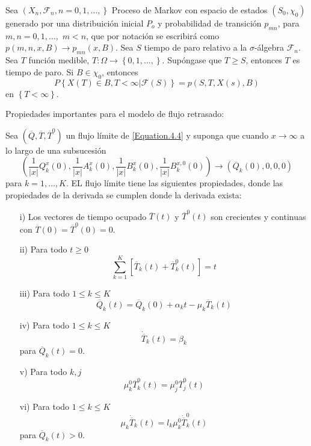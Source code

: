 \begin{Teo}
Sea $\left(X_{n},\mathcal{F}_{n},n=0,1,\ldots,\right\}$ Proceso de
Markov con espacio de estados $\left(S_{0},\chi_{0}\right)$
generado por una distribuici\'on inicial $P_{o}$ y probabilidad de
transici\'on $p_{mn}$, para $m,n=0,1,\ldots,$ $m<n$, que por
notaci\'on se escribir\'a como $p\left(m,n,x,B\right)\rightarrow
p_{mn}\left(x,B\right)$. Sea $S$ tiempo de paro relativo a la
$\sigma$-\'algebra $\mathcal{F}_{n}$. Sea $T$ funci\'on medible,
$T:\Omega\rightarrow\left\{0,1,\ldots,\right\}$. Sup\'ongase que
$T\geq S$, entonces $T$ es tiempo de paro. Si $B\in\chi_{0}$,
entonces
\begin{equation}\label{Prop.Fuerte.Markov}
P\left\{X\left(T\right)\in
B,T<\infty|\mathcal{F}\left(S\right)\right\} =
p\left(S,T,X\left(s\right),B\right)
\end{equation}
en $\left\{T<\infty\right\}$.
\end{Teo}

Propiedades importantes para el modelo de flujo retrasado:

\begin{Prop}
 Sea $\left(\overline{Q},\overline{T},\overline{T}^{0}\right)$ un flujo l\'imite de \ref{Equation.4.4} y suponga que cuando $x\rightarrow\infty$ a lo largo de
una subsucesi\'on
\[\left(\frac{1}{|x|}Q_{k}^{x}\left(0\right),\frac{1}{|x|}A_{k}^{x}\left(0\right),\frac{1}{|x|}B_{k}^{x}\left(0\right),\frac{1}{|x|}B_{k}^{x,0}\left(0\right)\right)\rightarrow\left(\overline{Q}_{k}\left(0\right),0,0,0\right)\]
para $k=1,\ldots,K$. EL flujo l\'imite tiene las siguientes
propiedades, donde las propiedades de la derivada se cumplen donde
la derivada exista:
\begin{itemize}
 \item[i)] Los vectores de tiempo ocupado $\overline{T}\left(t\right)$ y $\overline{T}^{0}\left(t\right)$ son crecientes y continuas con
$\overline{T}\left(0\right)=\overline{T}^{0}\left(0\right)=0$.
\item[ii)] Para todo $t\geq0$
\[\sum_{k=1}^{K}\left[\overline{T}_{k}\left(t\right)+\overline{T}_{k}^{0}\left(t\right)\right]=t\]
\item[iii)] Para todo $1\leq k\leq K$
\[\overline{Q}_{k}\left(t\right)=\overline{Q}_{k}\left(0\right)+\alpha_{k}t-\mu_{k}\overline{T}_{k}\left(t\right)\]
\item[iv)]  Para todo $1\leq k\leq K$
\[\dot{{\overline{T}}}_{k}\left(t\right)=\beta_{k}\] para $\overline{Q}_{k}\left(t\right)=0$.
\item[v)] Para todo $k,j$
\[\mu_{k}^{0}\overline{T}_{k}^{0}\left(t\right)=\mu_{j}^{0}\overline{T}_{j}^{0}\left(t\right)\]
\item[vi)]  Para todo $1\leq k\leq K$
\[\mu_{k}\dot{{\overline{T}}}_{k}\left(t\right)=l_{k}\mu_{k}^{0}\dot{{\overline{T}}}_{k}^{0}\left(t\right)\] para $\overline{Q}_{k}\left(t\right)>0$.
\end{itemize}
\end{Prop}

